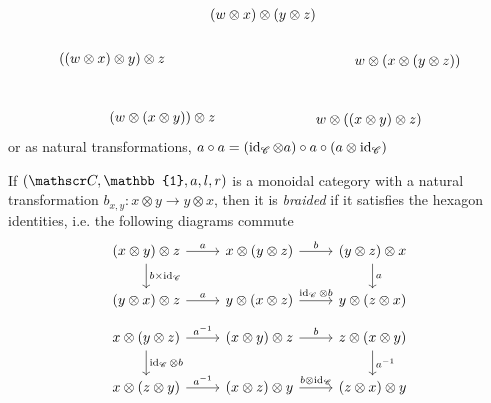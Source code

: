 \begin{definition}
\begin{enumerate}
\[\begin{tikzpicture}[x=0.75pt,y=0.75pt,yscale=-1,xscale=1]
\draw (74,299.4) node [anchor=north west][inner sep=0.75pt]    {$(( w\otimes x) \otimes y) \otimes z$};
\draw (218,257.4) node [anchor=north west][inner sep=0.75pt]    {$( w\otimes x) \otimes ( y\otimes z)$};
\draw (356,301.4) node [anchor=north west][inner sep=0.75pt]    {$w\otimes ( x\otimes ( y\otimes z))$};
\draw (122,355.4) node [anchor=north west][inner sep=0.75pt]    {$( w\otimes ( x\otimes y)) \otimes z$};
\draw (319,357.4) node [anchor=north west][inner sep=0.75pt]    {$w\otimes (( x\otimes y) \otimes z)$};


\end{tikzpicture}
\]
	or as natural transformations, $a\circ a=(\operatorname{\mathrm{id}}_{\mathscr{C}}\otimes a)\circ a\circ(a\otimes\operatorname{\mathrm{id}}_{\mathscr{C}})$
	\end{enumerate}
\end{definition}
\begin{definition} \label{braidedMonoidalCategory}
	If $(\sC,\mathbb{1},a,l,r)$ is a monoidal category with a natural transformation $b_{x,y}:x\otimes y\to y\otimes x$, then it is \emph{braided} if it satisfies the hexagon identities, i.e. the following diagrams commute
	\[
\begin{tikzcd}
(x\otimes y)\otimes z \arrow[d, "b\times\id_\sC"] \arrow[r, "a"] & x\otimes(y\otimes z) \arrow[r, "b"]                & (y\otimes z)\otimes x \arrow[d, "a"] \\
(y\otimes x)\otimes z \arrow[r, "a"]                             & y\otimes(x\otimes z) \arrow[r, "\id_\sC\otimes b"] & y\otimes(z\otimes x)                
\end{tikzcd}
	\]
	\[\begin{tikzcd}
x\otimes(y\otimes z) \arrow[r, "a^{-1}"] \arrow[d, "\id_\sC\otimes b"] & (x\otimes y)\otimes z \arrow[r, "b"]               & z\otimes(x\otimes y) \arrow[d, "a^{-1}"] \\
x\otimes(z\otimes y) \arrow[r, "a^{-1}"]                               & (x\otimes z)\otimes y \arrow[r, "b\otimes\id_\sC"] & (z\otimes x)\otimes y                   
\end{tikzcd}\]
\end{definition}